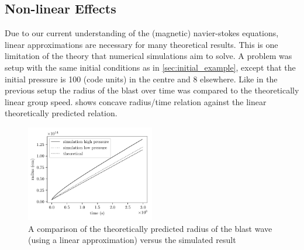 \documentclass[a4paper]{article}
\numberwithin{figure}{section}
\numberwithin{equation}{section}
\begin{document}
\subsection{Non-linear Effects} \label{sec:nonlinear_effects}
Due to our current understanding of the (magnetic) navier-stokes equations, linear approximations are necessary for many theoretical results. 
This is one limitation of the theory that numerical simulations aim to solve.
A problem was setup with the same initial conditions as in \cref{sec:initial_example}, except that the initial pressure is 100 (code units) in the centre and 8 elsewhere. 
Like in the previous setup the radius of the blast over time was compared to the theoretically linear group speed.
 shows concave radius/time relation against the linear theoretically predicted relation. 
\begin{figure}[h]
	\centering
	\includegraphics[width=0.5\textwidth]{figures/non_linear_effects.pdf}
	\caption{A comparison of the theoretically predicted radius of the blast wave (using a linear approximation) versus the simulated result}
	\label{fig:non_linear_effects}
\end{figure}
\end{document}

